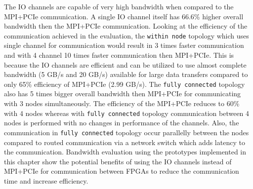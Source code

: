 The IO channels are capable of very high bandwidth when compared to the MPI+PCIe
communication. A single IO channel itself has 66.6\% higher overall bandwidth
then the MPI+PCIe communication. Looking at the efficiency of the communication achieved
in the evaluation, the \texttt{within node} topology which uses single
channel for communication would result in 3 times faster communication and with 4 channel
10 times faster communication then MPI+PCIe. This is because the IO channels are efficient
and can be utilized to use almost complete bandwidth (5 GB/s and 20 GB/s) available for large data transfers
compared to only 65\% efficiency of MPI+PCIe (2.99 GB/s). The \texttt{fully connected} topology
also has 5 times bigger overall bandwidth then MPI+PCIe for communicating with 3 nodes
simultaneously. The efficiency of the MPI+PCIe reduces to 60\% with 4 nodes whereas
with \texttt{fully connected} topology communication between 4 nodes is performed with
no changes in performance of the channels. Also, the communication in \texttt{fully connected}
topology occur parallelly between the nodes compared to routed communication via a network switch
which adds latency to the communication.
Bandwidth evaluation using the prototypes implemented in this chapter show the potential benefits
of using the IO channels instead of MPI+PCIe for communication between FPGAs to reduce the communication
time and increase efficiency.


